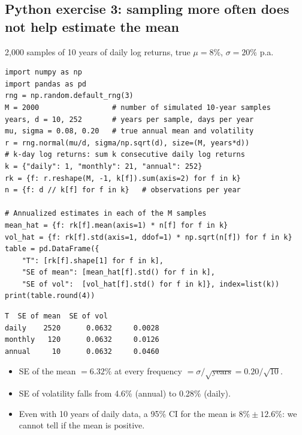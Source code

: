 \documentclass[11pt,a4paper]{report}
\begin{document}
\subsection*{Python exercise 3: sampling more often does not help estimate the mean}
2{,}000 samples of 10 years of daily log returns, true $\mu=8\%$, $\sigma=20\%$ p.a.
\begin{lstlisting}
import numpy as np
import pandas as pd
rng = np.random.default_rng(3)
M = 2000                 # number of simulated 10-year samples
years, d = 10, 252       # years per sample, days per year
mu, sigma = 0.08, 0.20   # true annual mean and volatility
r = rng.normal(mu/d, sigma/np.sqrt(d), size=(M, years*d))
# k-day log returns: sum k consecutive daily log returns
k = {"daily": 1, "monthly": 21, "annual": 252}
rk = {f: r.reshape(M, -1, k[f]).sum(axis=2) for f in k}
n = {f: d // k[f] for f in k}   # observations per year

# Annualized estimates in each of the M samples
mean_hat = {f: rk[f].mean(axis=1) * n[f] for f in k}
vol_hat = {f: rk[f].std(axis=1, ddof=1) * np.sqrt(n[f]) for f in k}
table = pd.DataFrame({
    "T": [rk[f].shape[1] for f in k],
    "SE of mean": [mean_hat[f].std() for f in k],
    "SE of vol":  [vol_hat[f].std() for f in k]}, index=list(k))
print(table.round(4))
\end{lstlisting}
\begin{lstlisting}[style=out]
            T  SE of mean  SE of vol
daily    2520      0.0632     0.0028
monthly   120      0.0632     0.0126
annual     10      0.0632     0.0460
\end{lstlisting}
\begin{itemize}
  \item SE of the mean $=6.32\%$ at every frequency $=\sigma/\sqrt{\text{years}}=0.20/\sqrt{10}$.
  \item SE of volatility falls from 4.6\% (annual) to 0.28\% (daily).
  \item Even with 10 years of daily data, a 95\% CI for the mean is
    $8\%\pm12.6\%$: we cannot tell if the mean is positive.
\end{itemize}
\end{document}
